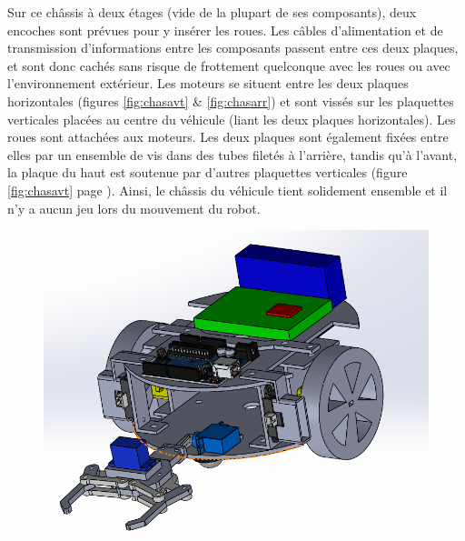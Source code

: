 \documentclass[a4paper,11pt]{article}
\begin{document}
Sur ce châssis à deux étages (vide de la plupart de ses composants), deux encoches sont prévues pour y insérer les roues. Les câbles d'alimentation et de transmission d'informations entre les composants passent entre ces deux plaques, et sont donc cachés sans risque de frottement quelconque avec les roues ou avec l'environnement extérieur. Les moteurs se situent entre les deux plaques horizontales (figures \ref{fig:chasavt} \& \ref{fig:chasarr}) et sont vissés sur les plaquettes verticales placées au centre du véhicule (liant les deux plaques horizontales). Les roues sont attachées aux moteurs. Les deux plaques sont également fixées entre elles par un ensemble de vis dans des tubes filetés à l'arrière, tandis qu'à l'avant, la plaque du haut est soutenue par d'autres plaquettes verticales (figure \ref{fig:chasavt} page \pageref{fig:chasavt}). Ainsi, le châssis du véhicule tient solidement ensemble et il n'y a aucun jeu lors du mouvement du robot. \newline

\begin{figure}[H]
\centering
    \begin{minipage}[c]{.46\linewidth}
        \includegraphics[scale = 0.6]{robot.PNG}
    \end{minipage}
\end{figure}
\end{document}

